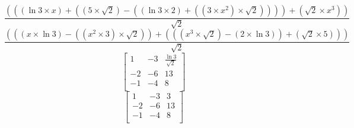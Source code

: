 \documentclass{article}
\begin{document}
$$
\frac{(((\ln{3}\times x)+((5\times \sqrt{2})-((\ln{3}\times 2)+((3\times x^{2})\times \sqrt{2}))))+(\sqrt{2}\times x^{3}))}{\sqrt{2}}
$$
$$
\frac{(((x\times \ln{3})-((x^{2}\times 3)\times \sqrt{2}))+(((x^{3}\times \sqrt{2})-(2\times \ln{3}))+(\sqrt{2}\times 5)))}{\sqrt{2}}
$$
$$
\begin{bmatrix}
1&-3&\frac{\ln{3}}{\sqrt{2}}\\
-2&-6&13\\
-1&-4&8\\
\end{bmatrix}
$$
$$
\begin{bmatrix}
1&-3&3\\
-2&-6&13\\
-1&-4&8\\
\end{bmatrix}
$$
\end{document}
